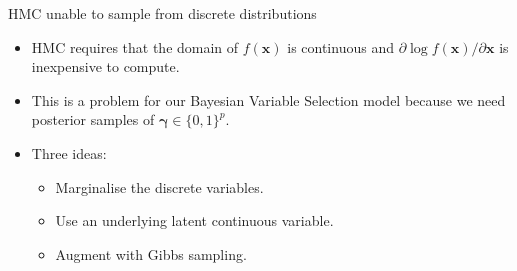 \documentclass{beamer}\usepackage[]{graphicx}\usepackage[]{color}
\newenvironment{knitrout}{}{} %
\begin{document}

\begin{frame}{HMC unable to sample from discrete distributions}
	\begin{itemize}
		\item HMC requires that the domain of $f(\mathbf x)$ is continuous and $\partial \log f(\mathbf x) / \partial \mathbf x$ is inexpensive to compute.

		\item This is a problem for our Bayesian Variable Selection model because we need posterior samples of $\boldsymbol{\gamma} \in \{0,1\}^p$.

		\item Three ideas:
		\begin{itemize}
			\item Marginalise the discrete variables.
			\item Use an underlying latent continuous variable.
			\item Augment with Gibbs sampling.
		\end{itemize}

	\end{itemize}

\end{frame}
\end{document}

